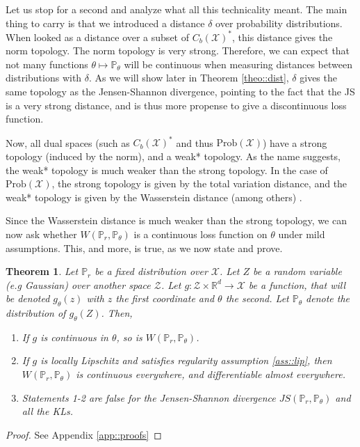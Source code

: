 \documentclass{article} %
\newcommand\PP{\mathbb{P}}
\newcommand\RR{\mathbb{R}}
\newtheorem{theo}{Theorem}
\theoremstyle{definition}
\theoremstyle{definition}
\newcommand\manX{\mathcal{X}}
\begin{document}
Let us stop for a second and analyze what all this technicality meant.
The main thing to carry is that we introduced a distance $\delta$
over probability distributions. When looked as a distance over
a subset of $C_b(\manX)^*$, this distance gives the norm topology.
The norm topology is very strong. Therefore, we can expect that
not many functions $\theta \mapsto \PP_\theta$ will be continuous
when measuring distances between distributions with $\delta$. As
we will show later in Theorem \autoref{theo::dist}, $\delta$ gives the same topology
as the Jensen-Shannon divergence, pointing to the fact that the
JS is a very strong distance, and is thus more propense to
give a discontinuous loss function.

Now, all dual spaces (such as $C_b(\manX)^*$ and thus
$\text{Prob}(\manX)$) have a strong topology (induced by the norm),
and a weak* topology. As the name suggests, the weak* topology
is much weaker than the strong topology. In the case of
$\text{Prob}(\manX)$, the strong topology is given by the
total variation distance, and the weak* topology is given
by the Wasserstein distance (among others) \cite{Vil}.

Since the Wasserstein distance is much weaker than the strong
topology, we can now ask whether $W(\PP_r, \PP_\theta)$ is
a continuous loss function on $\theta$ 
under mild assumptions. This, and more, is
true, as we now state and prove.

\begin{theo} \label{theo::regcost} Let $\PP_r$ be a fixed distribution over $\mathcal{X}$.
Let $Z$ be a random variable (e.g Gaussian) over another
space $\mathcal{Z}$. Let $g: \mathcal{Z} \times \RR^d \rightarrow \mathcal{X}$
be a function, that will be denoted $g_\theta(z)$ with $z$ the first coordinate
and $\theta$ the second. Let $\PP_\theta$ denote the distribution of $g_\theta(Z)$.
Then,
\begin{enumerate}
\item If $g$ is continuous in $\theta$, so is $W(\PP_r, \PP_\theta)$.
\item If $g$ is locally Lipschitz and satisfies regularity
assumption \ref{ass::lip},
then $W(\PP_r, \PP_\theta)$ is continuous
everywhere, and differentiable almost everywhere.
\item Statements 1-2 are false for the Jensen-Shannon divergence $JS(\PP_r, \PP_\theta)$
and all the KLs.
\end{enumerate}
\end{theo}
\begin{proof} 
See Appendix \ref{app::proofs}
\end{proof}
\end{document}
